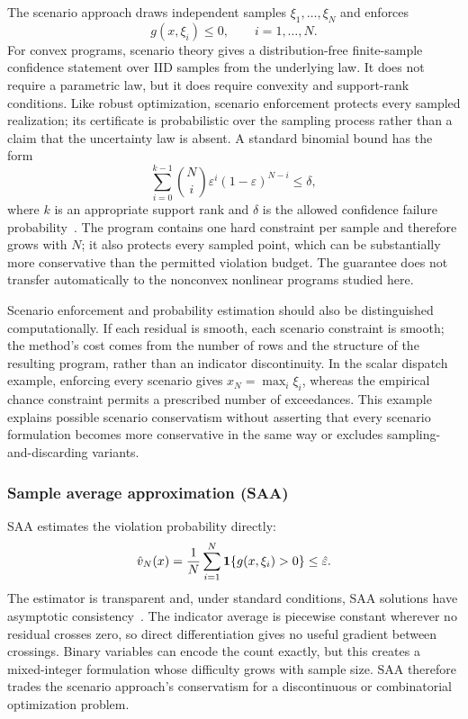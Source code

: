 The scenario approach draws independent samples $\xi_1,\ldots,\xi_N$ and enforces
\begin{equation}
 g(x,\xi_i)\leq0,\qquad i=1,\ldots,N.
 \label{eq:ch2-scenario}
\end{equation}
For convex programs, scenario theory gives a distribution-free finite-sample confidence statement over IID samples from the underlying law. It does not require a parametric law, but it does require convexity and support-rank conditions. Like robust optimization, scenario enforcement protects every sampled realization; its certificate is probabilistic over the sampling process rather than a claim that the uncertainty law is absent. A standard binomial bound has the form
\begin{equation}
 \sum_{i=0}^{k-1}\binom{N}{i}\varepsilon^i(1-\varepsilon)^{N-i}\leq\delta,
 \label{eq:ch2-scenario-bound}
\end{equation}
where $k$ is an appropriate support rank and $\delta$ is the allowed confidence failure probability~\citep{calafiore2006,campi2008}. The program contains one hard constraint per sample and therefore grows with $N$; it also protects every sampled point, which can be substantially more conservative than the permitted violation budget. The guarantee does not transfer automatically to the nonconvex nonlinear programs studied here.

Scenario enforcement and probability estimation should also be distinguished computationally. If each residual is smooth, each scenario constraint is smooth; the method's cost comes from the number of rows and the structure of the resulting program, rather than an indicator discontinuity. In the scalar dispatch example, enforcing every scenario gives $x_N=\max_i\xi_i$, whereas the empirical chance constraint permits a prescribed number of exceedances. This example explains possible scenario conservatism without asserting that every scenario formulation becomes more conservative in the same way or excludes sampling-and-discarding variants.

\subsubsection{Sample average approximation (SAA)}
\label{ssec:saa}

SAA estimates the violation probability directly:
\begin{equation}
 \hat v_N(x)=\frac1N\sum_{i=1}^N\mathbf{1}\{g(x,\xi_i)>0\}\leq\hat\varepsilon.
 \label{eq:ch2-saa}
\end{equation}
The estimator is transparent and, under standard conditions, SAA solutions have asymptotic consistency~\citep{luedtke2008,pagnoncelli2009}. The indicator average is piecewise constant wherever no residual crosses zero, so direct differentiation gives no useful gradient between crossings. Binary variables can encode the count exactly, but this creates a mixed-integer formulation whose difficulty grows with sample size. SAA therefore trades the scenario approach's conservatism for a discontinuous or combinatorial optimization problem.

